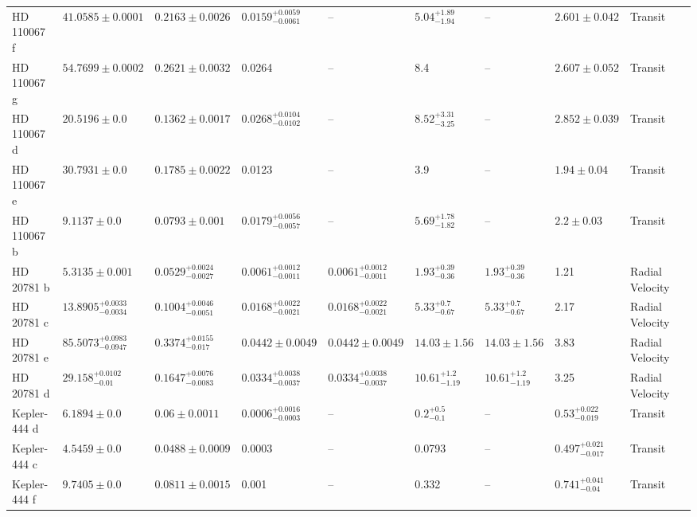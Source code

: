 \begin{tabular}{llllllllll}
HD 110067 f & $41.0585 \pm 0.0001$ & $0.2163 \pm 0.0026$ & $0.0159^{+0.0059}_{-0.0061}$ & -- & $5.04^{+1.89}_{-1.94}$ & -- & $2.601 \pm 0.042$ & Transit & \cite{LUQUE_ET_AL__2023} \\
HD 110067 g & $54.7699 \pm 0.0002$ & $0.2621 \pm 0.0032$ & 0.0264 & -- & 8.4 & -- & $2.607 \pm 0.052$ & Transit & \cite{LUQUE_ET_AL__2023} \\
HD 110067 d & $20.5196 \pm 0.0$ & $0.1362 \pm 0.0017$ & $0.0268^{+0.0104}_{-0.0102}$ & -- & $8.52^{+3.31}_{-3.25}$ & -- & $2.852 \pm 0.039$ & Transit & \cite{LUQUE_ET_AL__2023} \\
HD 110067 e & $30.7931 \pm 0.0$ & $0.1785 \pm 0.0022$ & 0.0123 & -- & 3.9 & -- & $1.94 \pm 0.04$ & Transit & \cite{LUQUE_ET_AL__2023} \\
HD 110067 b & $9.1137 \pm 0.0$ & $0.0793 \pm 0.001$ & $0.0179^{+0.0056}_{-0.0057}$ & -- & $5.69^{+1.78}_{-1.82}$ & -- & $2.2 \pm 0.03$ & Transit & \cite{LUQUE_ET_AL__2023} \\
HD 20781 b & $5.3135 \pm 0.001$ & $0.0529^{+0.0024}_{-0.0027}$ & $0.0061^{+0.0012}_{-0.0011}$ & $0.0061^{+0.0012}_{-0.0011}$ & $1.93^{+0.39}_{-0.36}$ & $1.93^{+0.39}_{-0.36}$ & 1.21 & Radial Velocity & \cite{UDRY_ET_AL__2019} \\
HD 20781 c & $13.8905^{+0.0033}_{-0.0034}$ & $0.1004^{+0.0046}_{-0.0051}$ & $0.0168^{+0.0022}_{-0.0021}$ & $0.0168^{+0.0022}_{-0.0021}$ & $5.33^{+0.7}_{-0.67}$ & $5.33^{+0.7}_{-0.67}$ & 2.17 & Radial Velocity & \cite{UDRY_ET_AL__2019} \\
HD 20781 e & $85.5073^{+0.0983}_{-0.0947}$ & $0.3374^{+0.0155}_{-0.017}$ & $0.0442 \pm 0.0049$ & $0.0442 \pm 0.0049$ & $14.03 \pm 1.56$ & $14.03 \pm 1.56$ & 3.83 & Radial Velocity & \cite{UDRY_ET_AL__2019} \\
HD 20781 d & $29.158^{+0.0102}_{-0.01}$ & $0.1647^{+0.0076}_{-0.0083}$ & $0.0334^{+0.0038}_{-0.0037}$ & $0.0334^{+0.0038}_{-0.0037}$ & $10.61^{+1.2}_{-1.19}$ & $10.61^{+1.2}_{-1.19}$ & 3.25 & Radial Velocity & \cite{UDRY_ET_AL__2019} \\
Kepler-444 d & $6.1894 \pm 0.0$ & $0.06 \pm 0.0011$ & $0.0006^{+0.0016}_{-0.0003}$ & -- & $0.2^{+0.5}_{-0.1}$ & -- & $0.53^{+0.022}_{-0.019}$ & Transit & \cite{CAMPANTE_ET_AL__2015} \\
Kepler-444 c & $4.5459 \pm 0.0$ & $0.0488 \pm 0.0009$ & 0.0003 & -- & 0.0793 & -- & $0.497^{+0.021}_{-0.017}$ & Transit & \cite{CAMPANTE_ET_AL__2015} \\
Kepler-444 f & $9.7405 \pm 0.0$ & $0.0811 \pm 0.0015$ & 0.001 & -- & 0.332 & -- & $0.741^{+0.041}_{-0.04}$ & Transit & \cite{CAMPANTE_ET_AL__2015} \\

\end{tabular}
